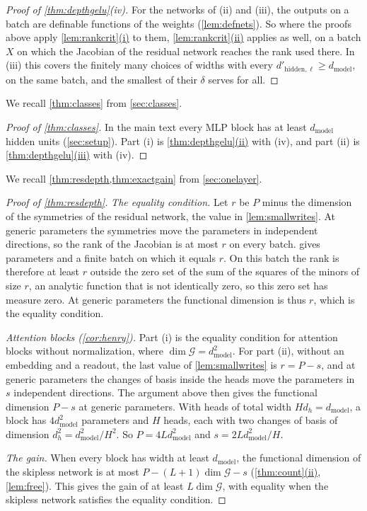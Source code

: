\documentclass[10pt]{article}
\theoremstyle{definition}
\theoremstyle{remark}
\newcommand{\dm}{d_{\mathrm{model}}}
\newcommand{\G}{\mathcal{G}}
\DeclareRobustCommand{\cpref}[2]{\hyperref[#1:#2]{\cref*{#1}(#2)}}
\begin{document}
\begin{proof}[Proof of \cref{thm:depthgelu}(iv)]
For the networks of (ii) and (iii), the outputs on a batch are definable functions of the weights (\cref{lem:defnets}). So where the proofs above apply \cpref{lem:rankcrit}{i} to them, \cpref{lem:rankcrit}{ii} applies as well, on a batch $X$ on which the Jacobian of the residual network reaches the rank used there. In (iii) this covers the finitely many choices of widths with every $d'_{\mathrm{hidden},\ell} \ge \dm$, on the same batch, and the smallest of their $\delta$ serves for all.
\end{proof}

We recall \cref{thm:classes} from \cref{sec:classes}.
\thmClasses*

\begin{proof}[Proof of \cref{thm:classes}]
In the main text every MLP block has at least $\dm$ hidden units (\cref{sec:setup}). Part (i) is \cpref{thm:depthgelu}{ii} with (iv), and part (ii) is \cpref{thm:depthgelu}{iii} with (iv).
\end{proof}

We recall \cref{thm:resdepth,thm:exactgain} from \cref{sec:onelayer}.
\thmResDepth*

\begin{proof}[Proof of \cref{thm:resdepth}]
\emph{The equality condition.} Let $r$ be $P$ minus the dimension of the symmetries of the residual network, the value in \cref{lem:smallwrites}. At generic parameters the symmetries move the parameters in independent directions, so the rank of the Jacobian is at most $r$ on every batch.  gives parameters and a finite batch on which it equals $r$. On this batch the rank is therefore at least $r$ outside the zero set of the sum of the squares of the minors of size $r$, an analytic function that is not identically zero, so this zero set has measure zero. At generic parameters the functional dimension is thus $r$, which is the equality condition.

\emph{Attention blocks (\cref{cor:henry}).} Part (i) is the equality condition for attention blocks without normalization, where $\dim\G = \dm^2$. For part (ii), without an embedding and a readout, the last value of \cref{lem:smallwrites} is $r = P - s$, and at generic parameters the changes of basis inside the heads move the parameters in $s$ independent directions. The argument above then gives the functional dimension $P - s$ at generic parameters. With heads of total width $Hd_h = \dm$, a block has $4\dm^2$ parameters and $H$ heads, each with two changes of basis of dimension $d_h^2 = \dm^2/H^2$. So $P = 4L\dm^2$ and $s = 2L\dm^2/H$.

\emph{The gain.} When every block has width at least $\dm$, the functional dimension of the skipless network is at most $P - (L+1)\dim\G - s$ (\cpref{thm:count}{ii}, \cref{lem:free}). This gives the gain of at least $L\dim\G$, with equality when the skipless network satisfies the equality condition.
\end{proof}
\end{document}
